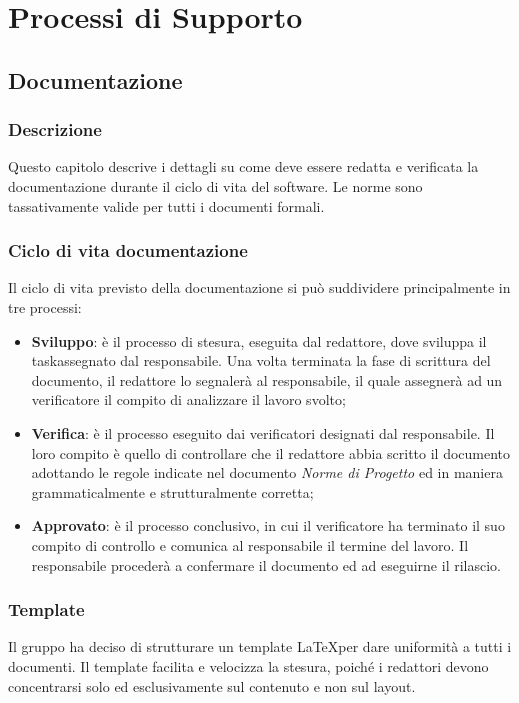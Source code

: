 \section{Processi di Supporto}\label{ProcessiSupporto}

\subsection{Documentazione}\label{ProcessiSupporto_Documentazione}

\subsubsection{Descrizione}
Questo capitolo descrive i dettagli su come deve essere redatta e verificata la documentazione durante il ciclo di vita del software. Le norme sono tassativamente valide per tutti i documenti formali.
\subsubsection{Ciclo di vita documentazione}
Il ciclo di vita previsto della documentazione si può suddividere principalmente in tre processi: 
\begin{itemize}
	\item \textbf{Sviluppo}: è il processo di stesura, eseguita dal redattore, dove sviluppa il task\glossario assegnato dal responsabile. Una volta terminata la fase di scrittura del documento, il redattore lo segnalerà al responsabile, il quale assegnerà ad un verificatore il compito di analizzare il lavoro svolto;
 	\item \textbf{Verifica}: è il processo eseguito dai verificatori designati dal responsabile. Il loro compito è quello di controllare che il redattore abbia scritto il documento adottando le regole indicate nel documento \textit{Norme di Progetto} ed in maniera grammaticalmente e strutturalmente corretta;
 	\item \textbf{Approvato}: è il processo conclusivo, in cui il verificatore ha terminato il suo compito di controllo e comunica al responsabile il termine del lavoro. Il responsabile procederà a confermare il documento ed ad eseguirne il rilascio.
\end{itemize} 

\subsubsection{Template}
Il gruppo ha deciso di strutturare un template \LaTeX  per dare uniformità a tutti i documenti. Il template facilita e velocizza la stesura, poiché i redattori devono concentrarsi solo ed esclusivamente sul contenuto e non sul layout.  

